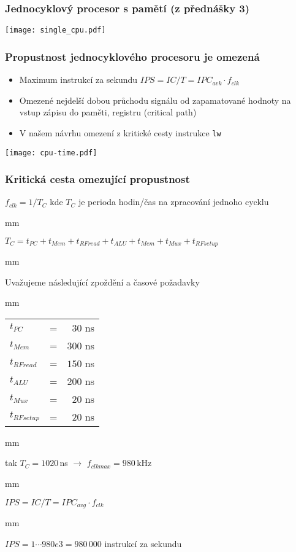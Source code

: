 \documentclass{beamer}
\begin{document}
\begin{frame}
\frametitle{Jednocyklový procesor s pamětí (z přednášky 3)}
\texttt{[image: single\_cpu.pdf]}
\end{frame}

\begin{frame}
\frametitle{Propustnost jednocyklového procesoru je omezená}

\begin{itemize}
 \item Maximum instrukcí za sekundu $IPS = IC / T = IPC_{avk} \cdot f_{clk}$
 \item Omezené nejdelší dobou průchodu signálu od zapamatované hodnoty na vstup zápisu do paměti, registru  (critical path)
 \item V našem návrhu omezení z kritické cesty instrukce \texttt{lw}
\end{itemize}

\texttt{[image: cpu-time.pdf]}
\end{frame}

\begin{frame}
\frametitle{Kritická cesta omezující propustnost}

$f_{clk} = 1 / T_{C}$ kde $T_{C}$ je perioda hodin/čas na zpracování jednoho cycklu

 mm

$T_{C} = t_{PC} + t_{Mem} + t_{RFread} + t_{ALU} + t_{Mem} + t_{Mux} + t_{RFsetup}$

 mm

Uvažujeme následující zpoždění a časové požadavky

 mm

\begin{tabular}{l c r}
$t_{PC}$ & = & $30$ ns \\
$t_{Mem}$ & = & $300$ ns \\
$t_{RFread}$ & = & $150$ ns \\
$t_{ALU}$ & = & $200$ ns \\
$t_{Mux}$ & = & $20$ ns \\
$t_{RFsetup}$ & = & $20$ ns \\
\end{tabular}

 mm

tak $T_{C} = 1020$\,ns $\rightarrow$ $f_{clk max} = 980$\,kHz

 mm

$IPS = IC / T = IPC_{avg} \cdot f_{clk}$

 mm

$IPS = 1 \cdots 980e3 = 980\,000$ instrukcí za sekundu

\end{frame}
\end{document}
